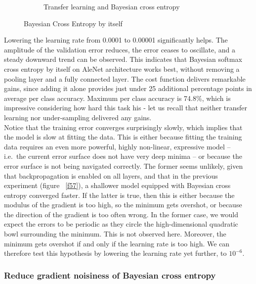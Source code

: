 \documentclass[a4paper,11pt]{article}
\begin{document}
\begin{figure}
\begin{minipage}[b]{\textwidth}
\begin{subfigure}{.5\textwidth}
        \caption{Transfer learning and Bayesian cross entropy}\label{fig:2b}
      \end{subfigure} \par \vspace*{20pt} %
      \caption{Bayesian Cross Entropy by itself}\label{fig:2}
    \end{minipage}%
    \label{f58}
\end{figure}

Lowering the learning rate from 0.0001 to 0.00001 significantly helps. The amplitude of the validation error reduces, the error ceases to oscillate, and a steady downward trend can be observed. This indicates that Bayesian softmax cross entropy by itself on AleNet architecture works best, without removing a pooling layer and a fully connected layer. The cost function delivers remarkable gains, since adding it alone provides just under 25 additional percentage points in average per class accuracy. Maximum per class accuracy is 74.8\%, which is impressive considering how hard this task his - let us recall that neither transfer learning nor under-sampling delivered any gains. \\

Notice that the training error converges surprisingly slowly, which implies that the model is slow at fitting the data. This is either because fitting the training data requires an even more powerful, highly non-linear, expressive model -- i.e.\ the current error surface does not have very deep minima -- or because the error surface is not being navigated correctly. The former seems unlikely, given that backpropagation is enabled on all layers, and that in the previous experiment (figure ~\ref{f57}), a shallower model equipped with Bayesian cross entropy converged faster. If the latter is true, then this is either because the modulus of the gradient is too high, so the minimum gets overshot, or because the direction of the gradient is too often wrong. In the former case, we would expect the errors to be periodic as they circle the high-dimensional quadratic bowl surrounding the minimum. This is not observed here. Moreover, the minimum gets overshot if and only if the learning rate is too high. We can therefore test this hypothesis by lowering the learning rate yet further, to $10^{-6}$. \\


\subsubsection{Reduce gradient noisiness of Bayesian cross entropy}
\end{document}
